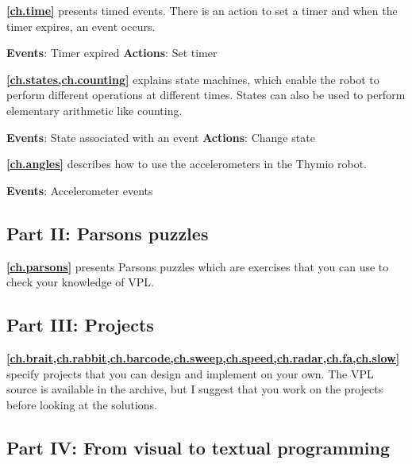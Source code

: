 \medskip

\textbf{\cref{ch.time}} presents timed events. There is an action
to set a timer and when the timer expires, an event occurs.

\textbf{Events}: Timer expired \hfill \textbf{Actions}: Set timer

 \hfill {}

\newpage

\textbf{\cref{ch.states,ch.counting}} explains state machines, which
enable the robot to perform different operations at different times.
States can also be used to perform elementary arithmetic like counting.

\textbf{Events}: State associated with an event \hfill \textbf{Actions}:
Change state

 \hfill {}

\medskip

\textbf{\cref{ch.angles}} describes how to use the accelerometers
in the Thymio robot.

\textbf{Events}: Accelerometer events

 \quad {}

\bigskip

\subsection*{Part II: Parsons puzzles}

\textbf{\cref{ch.parsons}} presents Parsons puzzles which are exercises
that you can use to check your knowledge of VPL.

\bigskip

\subsection*{Part III: Projects}

\textbf{\cref{ch.brait,ch.rabbit,ch.barcode,ch.sweep,ch.speed,ch.radar,ch.fa,ch.slow}}
specify projects that you can design and implement on your own.
The VPL source is available in the archive, but I suggest that you work
on the projects before looking at the solutions.

\bigskip

\subsection*{Part IV: From visual to textual programming}

